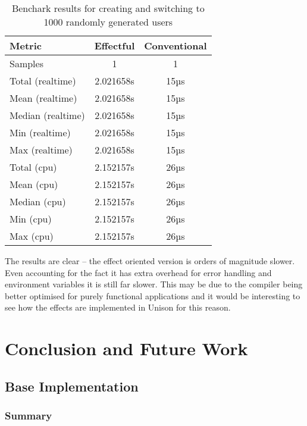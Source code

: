 \documentclass[logo,bsc,singlespacing,parskip]{infthesis}
\begin{document}
\begin{table}[htbp]
    \centering
    \begin{tabular}{lcc}
        \toprule
        \textbf{Metric} & \textbf{Effectful} & \textbf{Conventional} \\
        \midrule
        Samples           & 1                  & 1 \\
        \midrule
        Total (realtime)  & 2.021658s          & 15µs \\
        Mean (realtime)   & 2.021658s          & 15µs \\
        Median (realtime) & 2.021658s          & 15µs \\
        Min (realtime)    & 2.021658s          & 15µs \\
        Max (realtime)    & 2.021658s          & 15µs \\
        \midrule
        Total (cpu)       & 2.152157s          & 26µs \\
        Mean (cpu)        & 2.152157s          & 26µs \\
        Median (cpu)      & 2.152157s          & 26µs \\
        Min (cpu)         & 2.152157s          & 26µs \\
        Max (cpu)         & 2.152157s          & 26µs \\
        \bottomrule
    \end{tabular}
    \caption{Benchark results for creating and switching to 1000 randomly generated users}
    \label{tab:label_comparison}
  \end{table}

  The results are clear -- the effect oriented version is orders of magnitude
slower. Even accounting for the fact it has extra overhead for error handling
and environment variables it is still far slower. This may be due to the
compiler being better optimised for purely functional applications and it would
be interesting to see how the effects are implemented in Unison for this reason.


\chapter{Conclusion and Future Work}

\section{Base Implementation}

\subsection{Summary}
\end{document}
